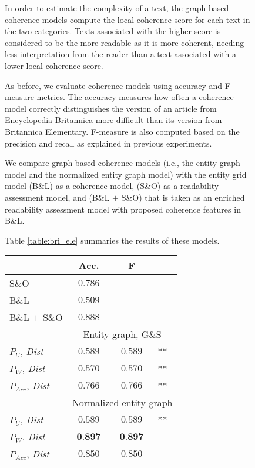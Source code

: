 \begin{figure}[!t]
In order to estimate the complexity of a text, the graph-based coherence models compute the local coherence score for each text in the two categories.  
Texts associated with the higher score is considered to be the more readable as it is more coherent, needing less interpretation from the reader than a text associated with a lower local coherence score. 


As before, we evaluate coherence models using accuracy and F-measure metrics. 
The accuracy measures how often a coherence model correctly distinguishes the version of an article from Encyclopedia Britannica more difficult than its version from Britannica Elementary. 
F-measure is also computed based on the precision and recall as explained in previous experiments. 

We compare graph-based coherence models (i.e., the entity graph model and the normalized entity graph model) with the entity grid model (B\&L) as a coherence model, (S\&O) as a readability assessment model, and (B\&L $+$ S\&O) that is taken as an enriched readability assessment model with proposed coherence features in B\&L. 


Table \ref{table:bri_ele} summaries the results of these models. 

\begin{table}[!t]
\centering
\begin{small}
\begin{tabular}{l|cc@{}l} 
  & Acc. & F  &\\\hline
  S\&O & $0.786$ & &\\
  B\&L & $0.509$ &  &\\
  B\&L $+$ S\&O & $0.888$ & &\\\hline

  & \multicolumn{3}{|c}{Entity graph, G\&S} \\\hline 

  $P_U$, \textit{Dist} & $0.589$ & $0.589$ &**  \\
  $P_W$, \textit{Dist} &  $0.570$ & $0.570$ &**  \\
  $P_{Acc}$, \textit{Dist} & $0.766$ & $0.766$ &** \\\hline 
	& \multicolumn{3}{|c}{Normalized entity graph} \\\hline 

  $P_U$, \textit{Dist} & $0.589$ & $0.589$&**  \\

  $P_W$, \textit{Dist} & $\textbf{0.897}$ & $\textbf{0.897}$&  \\
  $P_{Acc}$, \textit{Dist} & $0.850$ & $0.850$&


\end{tabular}
\end{small}
\end{table}
\end{figure}
